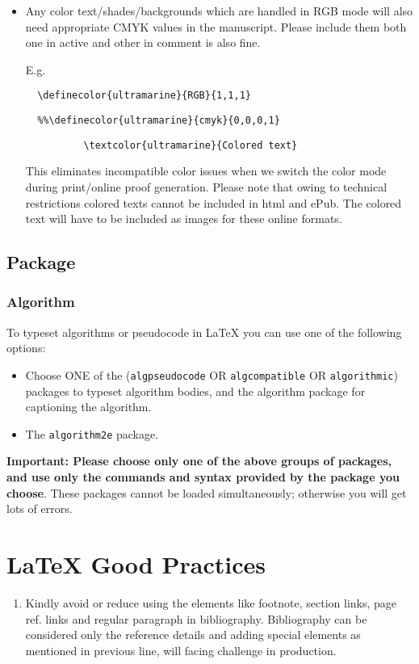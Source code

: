 \documentclass[graybox]{svmono}
\begin{document}
\begin{sloppy}
\begin{itemize}
\item Any color text/shades/backgrounds which are handled in RGB mode will also need appropriate CMYK values in the manuscript. Please include them both one in active and other in comment is also fine. 
    
\noindent
E.g. 
\begin{center}
\verb|	\definecolor{ultramarine}{RGB}{1,1,1}|

\verb|	%%\definecolor{ultramarine}{cmyk}{0,0,0,1}|
		
\verb|	        \textcolor{ultramarine}{Colored text}|
\end{center}
    
\eject

\noindent
This eliminates incompatible color issues when we switch the color mode during print/online proof generation. Please note that owing to technical restrictions colored texts cannot be included in html and ePub. The colored text will have to be included as images for these online formats.

\end{itemize}

\subsection*{Package}

\subsubsection*{Algorithm}

To typeset algorithms or pseudocode in LaTeX you can use one of the following options: 

\begin{itemize}
\item Choose ONE of the (\texttt{algpseudocode} OR \texttt{algcompatible} OR \texttt{algorithmic}) packages to typeset algorithm bodies, and the algorithm package for captioning the algorithm.

\item The \texttt{algorithm2e} package.
\end{itemize}

\noindent
\textbf{Important: Please choose only one of the above groups of packages, and use only the commands and syntax provided by the package you choose}. These packages cannot be loaded simultaneously; otherwise you will get lots of errors.


\section{LaTeX Good Practices}
\begin{enumerate}
\item[1.] Kindly avoid or reduce using the elements like footnote, section links, page ref. links and regular paragraph in bibliography. Bibliography can be considered only the reference details and adding special elements as mentioned in previous line, will facing challenge in production.


\end{enumerate}
\end{sloppy}
\end{document}
